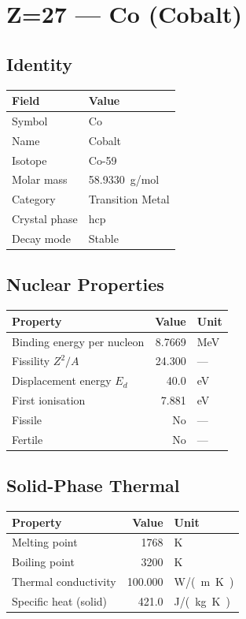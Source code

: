 \documentclass[11pt,a4paper]{article}
\begin{document}
\newpage

\section{Z=27 --- Co (Cobalt)}
\label{sec:Z27}

\subsection{Identity}
\begin{tabular}{ll}
  \toprule
  Field & Value \\
  \midrule
  Symbol & Co \\
  Name & Cobalt \\
  Isotope & Co-59 \\
  Molar mass & \SI{58.9330}{g/mol} \\
  Category & Transition Metal \\
  Crystal phase & hcp \\
  Decay mode & Stable \\
  \bottomrule
\end{tabular}

\subsection{Nuclear Properties}
\begin{tabular}{lrl}
  \toprule
  Property & Value & Unit \\
  \midrule
  Binding energy per nucleon & 8.7669 & \si{MeV} \\
  Fissility $Z^2/A$ & 24.300 & --- \\
  Displacement energy $E_d$ & 40.0 & \si{eV} \\
  First ionisation & 7.881 & \si{eV} \\
  Fissile & No & --- \\
  Fertile & No & --- \\
  \bottomrule
\end{tabular}

\subsection{Solid-Phase Thermal}
\begin{tabular}{lrl}
  \toprule
  Property & Value & Unit \\
  \midrule
  Melting point & 1768 & \si{K} \\
  Boiling point & 3200 & \si{K} \\
  Thermal conductivity & 100.000 & \si{W/(m.K)} \\
  Specific heat (solid) & 421.0 & \si{J/(kg.K)} \\
  \bottomrule
\end{tabular}
\end{document}
